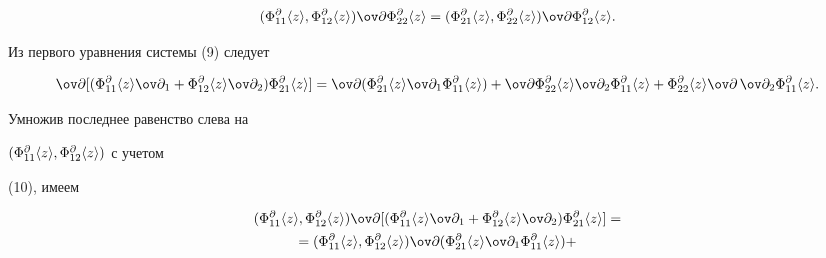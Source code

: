 \begin{pf}
\begin{equation}
(\Phi^\partial_{11}\la z \ra, 


\Phi^\partial_{12}\la z \ra)\ov\partial 


\Phi^\partial_{22}\la z \ra= 


(\Phi^\partial_{21}\la z \ra, 


\Phi^\partial_{22}\la z \ra) 


\ov\partial\Phi^\partial_{12}\la z \ra. 


\end{equation} 


Из первого уравнения системы (9) следует


$$


\ov\partial[(\Phi^\partial_{11}\la z \ra\ov\partial_1+ 


\Phi^\partial_{12}\la z \ra\ov\partial_2) 


\Phi^\partial_{21}\la z \ra]=


\ov\partial(\Phi^\partial_{21}\la z \ra\ov\partial_1 


\Phi^\partial_{11}\la z \ra)+\ov\partial 


\Phi^\partial_{22}\la z \ra\ov\partial_2 


\Phi^\partial_{11}\la z \ra+ 


\Phi^\partial_{22}\la z \ra\ov\partial\,\ov\partial_2 


\Phi^\partial_{11}\la z \ra. 


$$


Умножив последнее равенство слева на 


$(\Phi^\partial_{11}\langle z \rangle,\Phi^\partial_{12}\langle z \rangle)$ с учетом


(10), имеем 


\begin{multline} 


(\Phi^\partial_{11}\la z \ra, 


\Phi^\partial_{12}\la z \ra)\ov\partial 


[(\Phi^\partial_{11}\la z \ra\ov\partial_1+ 


\Phi^\partial_{12}\la z \ra\ov\partial_2)


\Phi^\partial_{21}\la z \ra]= \\ 


% 


=(\Phi^\partial_{11}\la z \ra, 


\Phi^\partial_{12}\la z \ra)\ov\partial 


(\Phi^\partial_{21}\la z \ra\ov\partial_1 


\Phi^\partial_{11}\la z \ra)+ 



\end{multline}
\end{pf}
